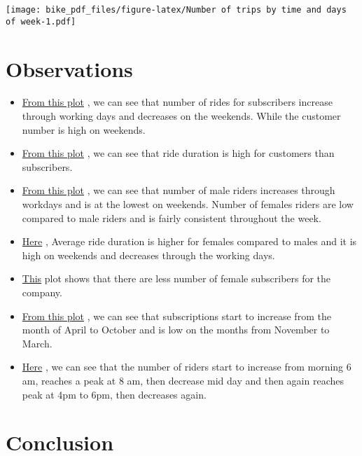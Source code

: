 \documentclass[
]{article}
\begin{document}
\texttt{[image: bike\_pdf\_files/figure-latex/Number of trips by time and days of week-1.pdf]}

\hypertarget{observations}{%
\section{Observations}\label{observations}}

\begin{itemize}
\item
  \protect\hyperlink{number-of-trips-by-usertype-and-weekday}{From this
  plot} , we can see that number of rides for subscribers increase
  through working days and decreases on the weekends. While the customer
  number is high on weekends.
\item
  \protect\hyperlink{mean-trip-duration-by-usertype-and-weekday}{From
  this plot} , we can see that ride duration is high for customers than
  subscribers.
\item
  \protect\hyperlink{number-of-trips-by-gender-and-weekday}{From this
  plot} , we can see that number of male riders increases through
  workdays and is at the lowest on weekends. Number of females riders
  are low compared to male riders and is fairly consistent throughout
  the week.
\item
  \protect\hyperlink{mean-trip-duration-by-gender-and-weekday}{Here} ,
  Average ride duration is higher for females compared to males and it
  is high on weekends and decreases through the working days.
\item
  \protect\hyperlink{number-of-male-and-female-users-by-usertype}{This}
  plot shows that there are less number of female subscribers for the
  company.
\item
  \protect\hyperlink{number-of-subscribers-by-months-and-days-of-week}{From
  this plot} , we can see that subscriptions start to increase from the
  month of April to October and is low on the months from November to
  March.
\item
  \protect\hyperlink{number-of-trips-by-time-and-days-of-week}{Here} ,
  we can see that the number of riders start to increase from morning 6
  am, reaches a peak at 8 am, then decrease mid day and then again
  reaches peak at 4pm to 6pm, then decreases again.
\end{itemize}

\hypertarget{conclusion}{%
\section{Conclusion}\label{conclusion}}
\end{document}
